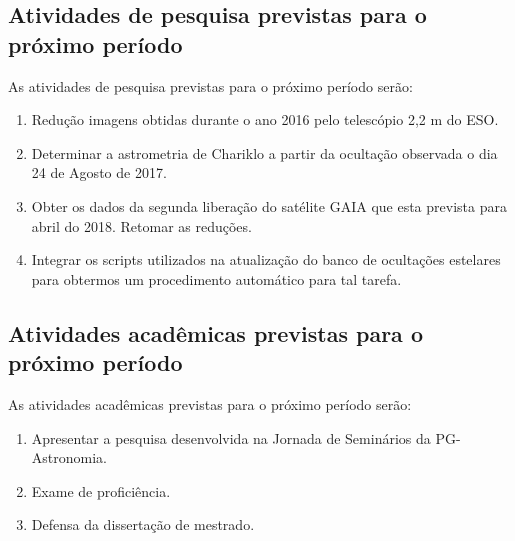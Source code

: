 \documentclass[a4paper, 11pt]{article}
\begin{document}
\subsection{Atividades de pesquisa previstas para o próximo período}
As atividades de pesquisa previstas para o pr\'oximo per\'iodo ser\~ao:

\begin{enumerate}
\item Redução imagens obtidas durante o ano 2016 pelo telescópio 2,2 m do ESO.
\item Determinar a astrometria de Chariklo a partir da ocultação observada o dia 24 de Agosto de 2017. 
\item Obter os dados da segunda liberação do satélite GAIA que esta prevista para abril do 2018. Retomar as redu\c c\~oes.
\item Integrar os scripts utilizados na atualiza\c c\~ao do banco de oculta\c c\~oes estelares para obtermos um procedimento autom\'atico para tal tarefa.
\end{enumerate}
\subsection{Atividades acadêmicas previstas para o próximo período}

As atividades acadêmicas previstas para o pr\'oximo per\'iodo ser\~ao:

\begin{enumerate}[resume]
  \item Apresentar a pesquisa desenvolvida na Jornada de Seminários da PG-Astronomia.
  \item Exame de proficiência.
  \item Defensa da dissertação de mestrado.  
\end{enumerate}
\end{document}
